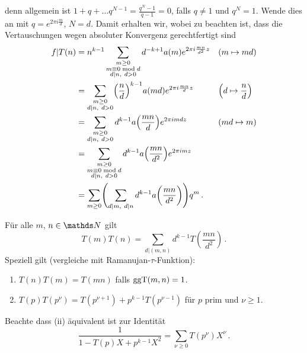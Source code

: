 \begin{bewe-list}
denn allgemein ist $1+q+\ldots q^{N-1} = \frac{q^N-1}{q-1} = 0$, falls $q\not=1$ und $q^N = 1$. Wende dies an mit $q=e^{2\pi i \frac{m}{d}}$, $N=d$.
Damit erhalten wir, wobei zu beachten ist, dass die Vertauschungen wegen absoluter Konvergenz gerechtfertigt sind
\begin{align*}
f|T(n)
&= n^{k-1} \sum_{\substack{m \geq 0 \\ m \equiv 0 \bmod d \\ d|n,\ d > 0}} d^{-k+1} a(m) e^{2\pi i\frac{mn}{d^2}z} &&(m\mapsto md) \\
&= \sum_{\substack{m \geq 0\\ d|n,\ d>0}} \Bigl(\frac{n}{d}\Bigr)^{k-1} a(md) e^{2\pi i \frac{mn}{d}z} &&\Bigl(d\mapsto\frac{n}{d}\Bigr) \\
&= \sum_{\substack{m \geq 0 \\ d|n,\ d>0}} d^{k-1} a\Bigl(\frac{mn}{d}\Bigr) e^{2\pi imdz} && (md\mapsto m) \\
&= \sum_{\substack{m\geq 0 \\ m\equiv 0 \bmod d \\ d|n,\ d>0}} d^{k-1} a\Bigl(\frac{mn}{d^2}\Bigr) e^{2\pi imz} \\
&= \sum_{m\geq 0} \Biggl(\sum_{d|m,\ d|n} d^{k-1} a\biggl(\frac{mn}{d^2}\biggr)\Biggr) q^m
\,.
\end{align*}
\end{bewe-list}

\begin{satz}\label{TmTn}
	Für alle $m$, $n \in \NN$ gilt
	\[
	T(m) T(n) = \sum_{d | (m,n)} d^{k-1} T \left( \frac {mn}{d^2} \right)
	\,.
	\]
	Speziell gilt (vergleiche mit Ramanujan-$\tau$-Funktion):
	\begin{enumerate}
		\item $T(n)T(m) = T(mn)$ falls $\operatorname{ggT}(m,n) = 1$.
		\item $T(p) T(p^\nu) = T(p^{\nu+1}) + p^{k-1} T(p^{\nu-1})$ für $p$ prim und $\nu \geq 1$.
	\end{enumerate}
	
	Beachte dass (ii) äquivalent ist zur Identität
	\[
	\frac{1}{1-T(p)X+p^{k-1}X^2} = \sum_{\nu \geq 0} T(p^\nu) X^\nu
	\,.
	\]
\end{satz}


